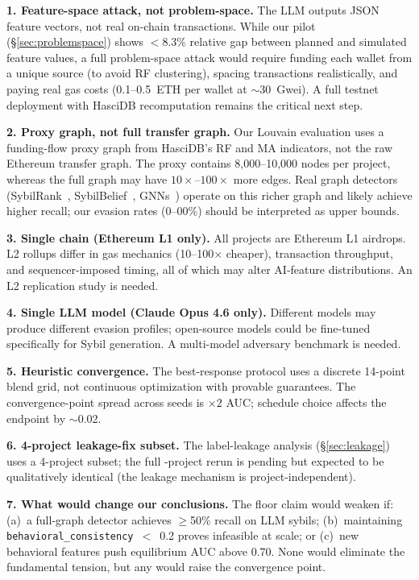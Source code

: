 \documentclass[sigconf,nonacm=false]{acmart}
\begin{document}
\noindent\textbf{1. Feature-space attack, not problem-space.}
The LLM outputs JSON feature vectors, not real on-chain transactions. While our pilot (\S\ref{sec:problemspace}) shows $<$8.3\% relative gap between planned and simulated feature values, a full problem-space attack would require funding each wallet from a unique source (to avoid RF clustering), spacing transactions realistically, and paying real gas costs (0.1--0.5~ETH per wallet at ${\sim}$30~Gwei). A full testnet deployment with HasciDB recomputation remains the critical next step.

\noindent\textbf{2. Proxy graph, not full transfer graph.}
Our Louvain evaluation uses a funding-flow proxy graph from HasciDB's RF and MA indicators, not the raw Ethereum transfer graph. The proxy contains 8,000--10,000 nodes per project, whereas the full graph may have $10\times$--$100\times$ more edges. Real graph detectors (SybilRank~\cite{cao2012sybilrank}, SybilBelief~\cite{gong2014sybilbelief}, GNNs~\cite{artemis}) operate on this richer graph and likely achieve higher recall; our evasion rates (\evasionGraphModerate{}0--\evasionGraphAdvanced{}00\%) should be interpreted as upper bounds.

\noindent\textbf{3. Single chain (Ethereum L1 only).}
All \largeScaleNProjects{} projects are Ethereum L1 airdrops. L2 rollups differ in gas mechanics (10--100$\times$ cheaper), transaction throughput, and sequencer-imposed timing, all of which may alter AI-feature distributions. An L2 replication study is needed.

\noindent\textbf{4. Single LLM model (Claude Opus 4.6 only).}
Different models may produce different evasion profiles; open-source models could be fine-tuned specifically for Sybil generation. A multi-model adversary benchmark is needed.

\noindent\textbf{5. Heuristic convergence.}
The best-response protocol uses a discrete 14-point blend grid, not continuous optimization with provable guarantees. The convergence-point spread across seeds is \bestResponseAucFloorStd{}$\times 2$ AUC; schedule choice affects the endpoint by ${\sim}$0.02.

\noindent\textbf{6. 4-project leakage-fix subset.}
The label-leakage analysis (\S\ref{sec:leakage}) uses a 4-project subset; the full \largeScaleNProjects{}-project rerun is pending but expected to be qualitatively identical (the leakage mechanism is project-independent).

\noindent\textbf{7. What would change our conclusions.}
The floor claim would weaken if: (a)~a full-graph detector achieves $\ge$50\% recall on LLM sybils; (b)~maintaining \texttt{behavioral\_consistency}~$<$~0.2 proves infeasible at scale; or (c)~new behavioral features push equilibrium AUC above 0.70. None would eliminate the fundamental tension, but any would raise the convergence point.
\end{document}
